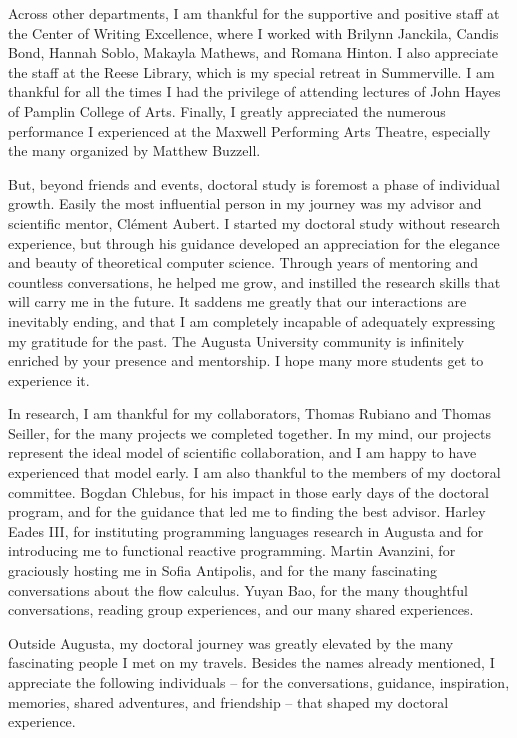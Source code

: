 Across other departments, I am thankful for the supportive and positive staff at the Center of Writing Excellence,
where I worked with Brilynn Janckila, Candis Bond, Hannah Soblo, Makayla Mathews, and Romana Hinton.
I also appreciate the staff at the Reese Library, which is my special retreat in Summerville.
I am thankful for all the times I had the privilege of attending lectures of John Hayes of Pamplin College of Arts.
Finally, I greatly appreciated the numerous performance I experienced at the Maxwell Performing Arts Theatre, especially the many organized by Matthew Buzzell.

But, beyond friends and events, doctoral study is foremost a phase of individual growth.
Easily the most influential person in my journey was my advisor and scientific mentor, Clément Aubert.
I started my doctoral study without research experience, but through his guidance developed an appreciation for the elegance and beauty of theoretical computer science.
Through years of mentoring and countless conversations, he helped me grow, and instilled the research skills that will carry me in the future.
It saddens me greatly that our interactions are inevitably ending, and that I am completely incapable of adequately expressing my gratitude for the past.
The Augusta University community is infinitely enriched by your presence and mentorship.
I hope many more students get to experience it.

In research, I am thankful for my collaborators, Thomas Rubiano and Thomas Seiller, for the many projects we completed together.
In my mind, our projects represent the ideal model of scientific collaboration, and I am happy to have experienced that model early.
I am also thankful to the members of my doctoral committee.
Bogdan Chlebus, for his impact in those early days of the doctoral program, and for the guidance that led me to finding the best advisor.
Harley Eades III, for instituting programming languages research in Augusta and for introducing me to functional reactive programming.
Martin Avanzini, for graciously hosting me in Sofia Antipolis, and for the many fascinating conversations about the flow calculus.
Yuyan Bao, for the many thoughtful conversations, reading group experiences, and our many shared experiences.

Outside Augusta, my doctoral journey was greatly elevated by the many fascinating people I met on my travels.
Besides the names already mentioned, I appreciate the following individuals %
-- for the conversations, guidance, inspiration, memories, shared adventures, and friendship --
that shaped my doctoral experience.

